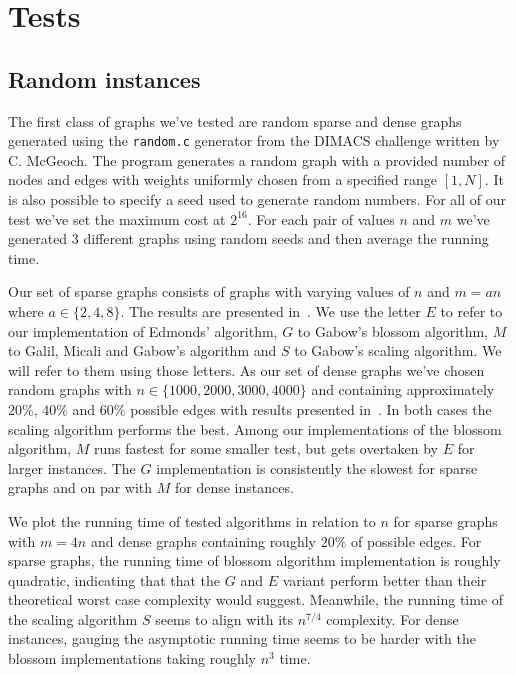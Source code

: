 \section{Tests}

\subsection{Random instances}

The first class of graphs we've tested are random sparse and dense graphs generated using the \texttt{random.c} generator from the DIMACS challenge written by C. McGeoch. The program generates a random graph with a provided number of nodes and edges with weights uniformly chosen from a specified range $[1, N]$. It is also possible to specify a seed used to generate random numbers. For all of our test we've set the maximum cost at $2^{16}$. For each pair of values $n$ and $m$ we've generated $3$ different graphs using random seeds and then average the running time.

Our set of sparse graphs consists of graphs with varying values of $n$ and $m = a n$ where $a \in \{2, 4, 8 \}$. The results are presented in~. We use the letter $E$ to refer to our implementation of Edmonds' algorithm, $G$ to Gabow's blossom algorithm, $M$ to Galil, Micali and Gabow's algorithm and $S$ to Gabow's scaling algorithm. We will refer to them using those letters. 
As our set of dense graphs we've chosen random graphs with $n \in \{ 1000, 2000, 3000, 4000 \}$ and containing approximately $20\%$, $40\%$ and $60\%$ possible edges with results presented in~. In both cases the scaling algorithm performs the best. Among our implementations of the blossom algorithm, $M$ runs fastest for some smaller test, but gets overtaken by $E$ for larger instances. The $G$ implementation is consistently the slowest for sparse graphs and on par with $M$ for dense instances.

We plot the running time of tested algorithms in relation to $n$ for sparse graphs with $m = 4 n$ and dense graphs containing roughly $20\%$ of possible edges. For sparse graphs, the running time of blossom algorithm implementation is roughly quadratic, indicating that that the $G$ and $E$ variant perform better than their theoretical worst case complexity would suggest. Meanwhile, the running time of the scaling algorithm $S$ seems to align with its $n^{7/4}$ complexity. For dense instances, gauging the asymptotic running time seems to be harder with the blossom implementations taking roughly $n^3$ time. 


